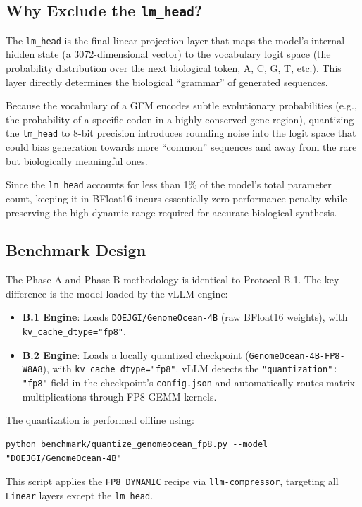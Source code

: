 \documentclass[12pt]{article}
\begin{document}
\subsection{Why Exclude the \texttt{lm\_head}?}

The \texttt{lm\_head} is the final linear projection layer that maps the model's internal hidden state (a 3072-dimensional vector) to the vocabulary logit space (the probability distribution over the next biological token, A, C, G, T, etc.). This layer directly determines the biological ``grammar'' of generated sequences.

Because the vocabulary of a GFM encodes subtle evolutionary probabilities (e.g., the probability of a specific codon in a highly conserved gene region), quantizing the \texttt{lm\_head} to 8-bit precision introduces rounding noise into the logit space that could bias generation towards more ``common'' sequences and away from the rare but biologically meaningful ones.

Since the \texttt{lm\_head} accounts for less than 1\% of the model's total parameter count, keeping it in BFloat16 incurs essentially zero performance penalty while preserving the high dynamic range required for accurate biological synthesis.

\subsection{Benchmark Design}

The Phase A and Phase B methodology is identical to Protocol B.1. The key difference is the model loaded by the vLLM engine:
\begin{itemize}
    \item \textbf{B.1 Engine}: Loads \texttt{DOEJGI/GenomeOcean-4B} (raw BFloat16 weights), with \texttt{kv\_cache\_dtype="fp8"}.
    \item \textbf{B.2 Engine}: Loads a locally quantized checkpoint (\texttt{GenomeOcean-4B-FP8-W8A8}), with \texttt{kv\_cache\_dtype="fp8"}. vLLM detects the \texttt{"quantization": "fp8"} field in the checkpoint's \texttt{config.json} and automatically routes matrix multiplications through FP8 GEMM kernels.
\end{itemize}

The quantization is performed offline using:
\begin{verbatim}
python benchmark/quantize_genomeocean_fp8.py --model "DOEJGI/GenomeOcean-4B"
\end{verbatim}
This script applies the \texttt{FP8\_DYNAMIC} recipe via \texttt{llm-compressor}, targeting all \texttt{Linear} layers except the \texttt{lm\_head}.
\end{document}
